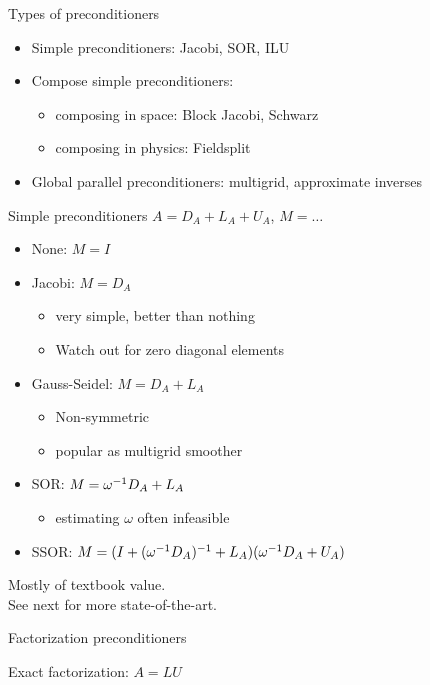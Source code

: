 \begin{longstory}
\begin{numberedframe}{Types of preconditioners}
  \begin{itemize}
  \item Simple preconditioners: Jacobi, SOR, ILU
  \item Compose simple preconditioners:
    \begin{itemize}
    \item composing in space: Block Jacobi, Schwarz
    \item composing in physics: Fieldsplit
    \end{itemize}
  \item Global parallel preconditioners: multigrid, approximate
    inverses
  \end{itemize}
\end{numberedframe}

\begin{numberedframe}{Simple preconditioners}
  $A = D_A+L_A+U_A$, $M=\ldots$
  \begin{itemize}
  \item None: $M=I$
  \item Jacobi: $M=D_A$
    \begin{itemize}
    \item very simple, better than nothing
    \item Watch out for zero diagonal elements
    \end{itemize}
  \item Gauss-Seidel: $M=D_A+L_A$
    \begin{itemize}
    \item Non-symmetric
    \item popular as multigrid smoother
    \end{itemize}
  \item SOR: $M=\omega^{-1} D_A+L_A$
    \begin{itemize}
    \item estimating $\omega$ often infeasible
    \end{itemize}
  \item SSOR: $M=(I+(\omega^{-1} D_A)^{-1}+L_A)(\omega^{-1} D_A+U_A)$
  \end{itemize}
  Mostly of textbook value.\\
  See next for more state-of-the-art.
\end{numberedframe}

\begin{numberedframe}{Factorization preconditioners}

Exact factorization: $A=LU$


\end{numberedframe}
\end{longstory}

